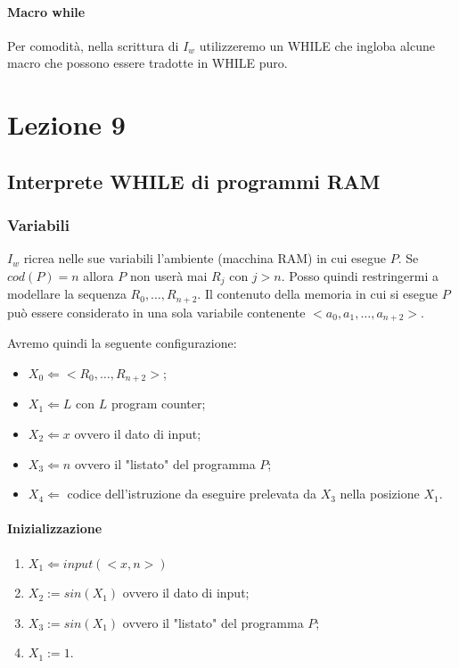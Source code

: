 \documentclass{article}
\begin{document}
\paragraph{Macro while}
Per comodità, nella scrittura di $I_w$ utilizzeremo un WHILE che ingloba alcune macro che possono essere tradotte in WHILE puro.
\section{Lezione 9}
\subsection{Interprete WHILE di programmi RAM}
\subsubsection{Variabili}
$I_w$ ricrea nelle sue variabili l'ambiente (macchina RAM) in cui esegue $P$.
Se $cod(P)=n$ allora $P$ non userà mai $R_j$ con $j>n$. Posso quindi restringermi a modellare la sequenza $R_0,\dots,R_{n+2}$. Il contenuto della memoria in cui si esegue $P$ può essere considerato in una sola variabile contenente $<a_0,a_1, \dots, a_{n+2}>$.



\noindent
Avremo quindi la seguente configurazione:
\begin{itemize}
	\item $X_0 \Leftarrow <R_0,\dots,R_{n+2}>$;
	\item $X_1 \Leftarrow L$ con $L$ program counter;
	\item $X_2 \Leftarrow x$ ovvero il dato di input;
	\item $X_3 \Leftarrow n$ ovvero il "listato" del programma $P$; 
	\item $X_4 \Leftarrow$  codice dell'istruzione da eseguire prelevata da $X_3$ nella posizione $X_1$. 
\end{itemize}

\paragraph{Inizializzazione}
\begin{enumerate}
	\item $X_1 \Leftarrow input(<x,n>)$
	\item $X_2:= sin(X_1)$ ovvero il dato di input;
	\item $X_3:= sin(X_1)$ ovvero il "listato" del programma $P$; 
	\item $X_1 :=1$. 
\end{enumerate}
\end{document}
